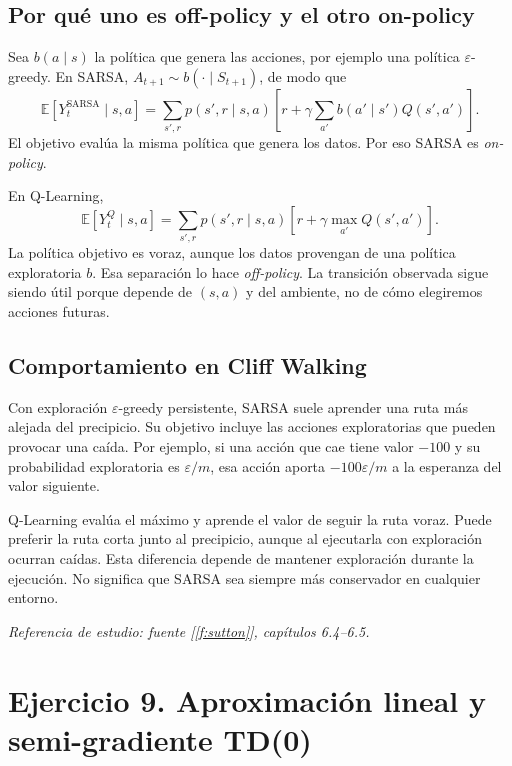 \documentclass[11pt,a4paper]{article}
\newcommand{\E}{\mathbb{E}}
\newcommand{\apartado}[1]{\subsection*{#1}}
\begin{document}
\apartado{Por qué uno es off-policy y el otro on-policy}
Sea $b(a\mid s)$ la política que genera las acciones, por ejemplo una política $\varepsilon$-greedy. En SARSA, $A_{t+1}\sim b(\cdot\mid S_{t+1})$, de modo que
\[
\E[Y_t^{\mathrm{SARSA}}\mid s,a]
=\sum_{s',r}p(s',r\mid s,a)
\left[r+\gamma\sum_{a'}b(a'\mid s')Q(s',a')\right].
\]
El objetivo evalúa la misma política que genera los datos. Por eso SARSA es \textit{on-policy}.

En Q-Learning,
\[
\E[Y_t^{Q}\mid s,a]
=\sum_{s',r}p(s',r\mid s,a)
\left[r+\gamma\max_{a'}Q(s',a')\right].
\]
La política objetivo es voraz, aunque los datos provengan de una política exploratoria $b$. Esa separación lo hace \textit{off-policy}. La transición observada sigue siendo útil porque depende de $(s,a)$ y del ambiente, no de cómo elegiremos acciones futuras.

\apartado{Comportamiento en Cliff Walking}
Con exploración $\varepsilon$-greedy persistente, SARSA suele aprender una ruta más alejada del precipicio. Su objetivo incluye las acciones exploratorias que pueden provocar una caída. Por ejemplo, si una acción que cae tiene valor $-100$ y su probabilidad exploratoria es $\varepsilon/m$, esa acción aporta $-100\varepsilon/m$ a la esperanza del valor siguiente.

Q-Learning evalúa el máximo y aprende el valor de seguir la ruta voraz. Puede preferir la ruta corta junto al precipicio, aunque al ejecutarla con exploración ocurran caídas. Esta diferencia depende de mantener exploración durante la ejecución. No significa que SARSA sea siempre más conservador en cualquier entorno.

\textit{Referencia de estudio: fuente [\ref{f:sutton}], capítulos 6.4--6.5.}

\section{Ejercicio 9. Aproximación lineal y semi-gradiente TD(0)}
\end{document}
